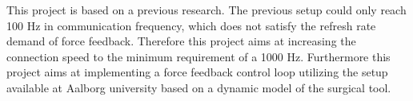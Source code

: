 
This project is based on a previous research. The previous setup could only reach 100 Hz in communication frequency\cite{Chris_Surgical}, which does not satisfy the refresh rate demand of force feedback. Therefore this project aims at increasing the connection speed to the minimum
requirement of a 1000 Hz.
Furthermore this project aims at implementing a force feedback control loop utilizing the setup available at Aalborg university based on a dynamic model of the surgical tool.









